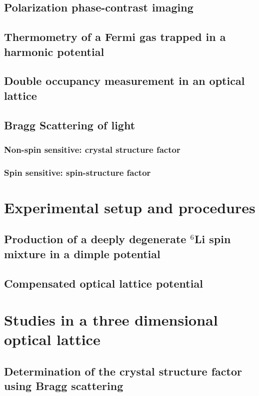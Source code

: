 \documentclass[oneside,11pt]{memoir}
\begin{document}
\section{Polarization phase-contrast imaging} 

\section{Thermometry of a Fermi gas trapped in a harmonic potential} 

\section{Double occupancy measurement in an optical lattice }

\section{Bragg Scattering of light}
 
\subsection{ Non-spin sensitive: crystal structure factor}
\subsection{ Spin sensitive:  spin-structure factor} 

\chapter{Experimental setup and procedures} 

\section{Production of a deeply degenerate $^{6}$Li spin mixture in a dimple potential } 

\section{Compensated optical lattice potential} 

\chapter{Studies in a three dimensional optical lattice} 

\section{Determination of the crystal structure factor using Bragg scattering}
\end{document}
